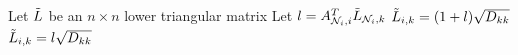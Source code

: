 \documentclass{standalone}
\begin{document}
\nopagecolor
\begin{algorithm}
	\caption{Calculation of $(I-A)^{-1}D^{1/2}$}
	\label{alg:approxchol}
	\begin{algorithmic}
		\State Let $\Tilde{L}$ be an $n \times n$ lower triangular matrix
		\State Let $l = A_{\mathcal{N}_i,i}^T \Tilde{L}_{\mathcal{N}_i,k}$
		\State $\Tilde{L}_{i,k} = (1 + l)\sqrt{D_{kk}}$
		\Else
		\State $\Tilde{L}_{i,k} = l\sqrt{D_{kk}}$
		\EndIf
		\EndFor
		\EndFor
	\end{algorithmic}
\end{algorithm}
\end{document}
